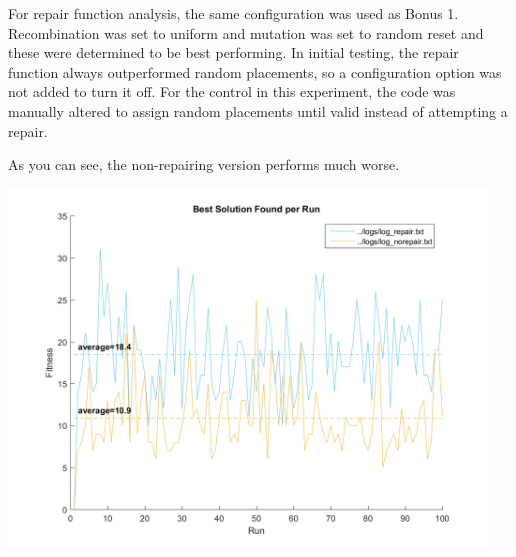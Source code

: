 \documentclass[11pt]{article}
\begin{document}
For repair function analysis, the same configuration was used as Bonus 1. Recombination was set to uniform and mutation was set to random reset and these were determined to be best performing. In initial testing, the repair function always outperformed random placements, so a configuration option was not added to turn it off. For the control in this experiment, the code was manually altered to assign random placements until valid instead of attempting a repair. 

As you can see, the non-repairing version performs much worse.

\begin{center}
	\includegraphics[width=5in]{graph_bonus2_repair.png}
\end{center}
\end{document}
